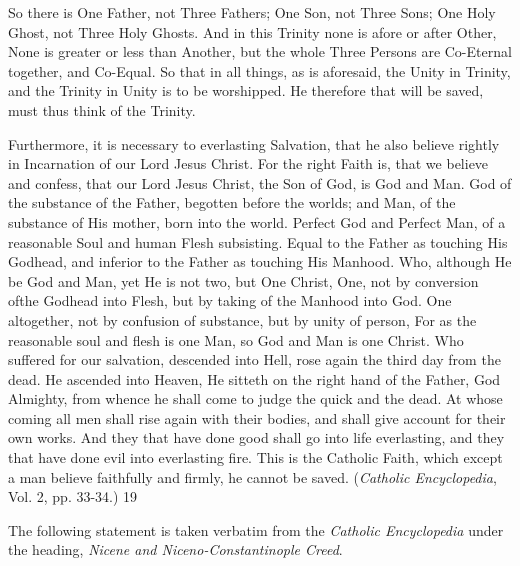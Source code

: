 So there is One Father, not Three Fathers; One Son, not Three Sons; One Holy Ghost, not
Three Holy Ghosts. And in this Trinity none is afore or after Other, None is greater or less
than Another, but the whole Three Persons are Co-Eternal together, and Co-Equal. So that in
all things, as is aforesaid, the Unity in Trinity, and the Trinity in Unity is to be worshipped.
He therefore that will be saved, must thus think of the Trinity.

Furthermore, it is necessary to everlasting Salvation, that he also believe rightly in
Incarnation of our Lord Jesus Christ. For the right Faith is, that we believe and confess, that
our Lord Jesus Christ, the Son of God, is God and Man. God of the substance of the Father,
begotten before the worlds; and Man, of the substance of His mother, born into the world.
Perfect God and Perfect Man, of a reasonable Soul and human Flesh subsisting. Equal to the
Father as touching His Godhead, and inferior to the Father as touching His Manhood. Who,
although He be God and Man, yet He is not two, but One Christ, One, not by conversion ofthe Godhead into Flesh, but by taking of the Manhood into God. One altogether, not by
confusion of substance, but by unity of person, For as the reasonable soul and flesh is one
Man, so God and Man is one Christ. Who suffered for our salvation, descended into Hell,
rose again the third day from the dead. He ascended into Heaven, He sitteth on the right hand
of the Father, God Almighty, from whence he shall come to judge the quick and the dead. At
whose coming all men shall rise again with their bodies, and shall give account for their own
works. And they that have done good shall go into life everlasting, and they that have done
evil into everlasting fire. This is the Catholic Faith, which except a man believe faithfully and
firmly, he cannot be saved. (\textit{Catholic Encyclopedia}, Vol. 2, pp. 33-34.) 19

The following statement is taken verbatim from the \textit{Catholic Encyclopedia} under the
heading, \textit{Nicene and Niceno-Constantinople Creed}.

